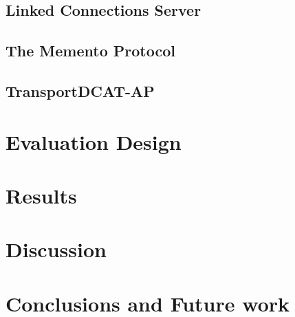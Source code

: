 \documentclass[sw]{iosart2x}
\begin{document}
\subsection{Linked Connections Server}

\subsection{The Memento Protocol}

\subsection{TransportDCAT-AP}

\section{Evaluation Design}



\section{Results}

\section{Discussion}

\section{Conclusions and Future work}

\begin{acks}
	
\end{acks}




\end{document}
